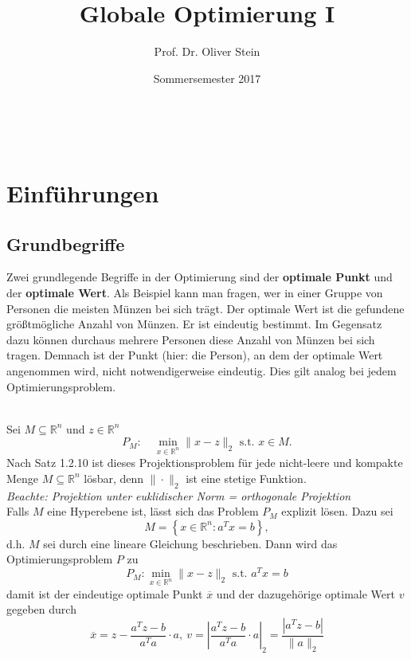 \documentclass[12pt]{extreport} %
\title{Globale Optimierung I}
\author{Prof. Dr. Oliver Stein}
\date{Sommersemester 2017}
\makeatletter
\newcommand{\R}{\mathbb{R}}
\theoremstyle{named}
\theoremstyle{nnamed}
\theoremstyle{itshape}
\theoremstyle{normal}
\def\maketitle{ \begin{titlepage} 
			~\vspace{3cm} 
		\begin{center} {\Huge \@title} \end{center} 
	 		\vspace*{1cm} 
	 	\begin{center} {\large \@author} \end{center} 
	 	\vspace*{-0.5cm}
	 	\begin{center} \@date \end{center} 
	 		\vspace*{7cm} 
	 	\begin{center} \@publishers \end{center} 
	 		\vfill 
	\end{titlepage} }
\makeatother
\begin{document}
\thispagestyle{empty}

\begin{titlepage}
	\maketitle
	\thispagestyle{empty}
\end{titlepage}



\chapter{Einführungen}

\section{Grundbegriffe}

Zwei grundlegende Begriffe in der Optimierung sind der \textbf{optimale Punkt} und der \textbf{optimale Wert}. Als Beispiel kann man fragen, wer in einer Gruppe von Personen die meisten Münzen bei sich trägt. Der optimale Wert ist die gefundene größtmögliche Anzahl von Münzen. Er ist eindeutig bestimmt. Im Gegensatz dazu können durchaus mehrere Personen diese Anzahl von Münzen bei sich tragen. Demnach ist der Punkt (hier: die Person), an dem der optimale Wert angenommen wird, nicht notwendigerweise eindeutig. Dies gilt analog bei jedem Optimierungsproblem.

\begin{beispiel} ~\\
Sei $M \subseteq \R^n$ und $z \in \R^n$
$$ P_M: \quad \min_{x \in \R^n} \| x - z \|_2 \text{ s.t. } x \in M. $$
Nach Satz 1.2.10 ist dieses Projektionsproblem für jede nicht-leere und kompakte Menge $M \subseteq \R^n$ lösbar, denn $\| \cdot \|_2$ ist eine stetige Funktion. ~\\

\textit{Beachte: Projektion unter euklidischer Norm = orthogonale Projektion} ~\\

Falls $M$ eine Hyperebene ist, lässt sich das Problem $P_M$ explizit lösen. Dazu sei 
$$ M = \left\{ x \in \R^n \colon a^T x = b \right\}, $$
d.h. $M$ sei durch eine lineare Gleichung beschrieben. Dann wird das Optimierungsproblem $P$ zu
$$ P_M\colon \min_{x \in \R^n} \| x - z \|_2 \text{ s.t. } a^Tx = b $$
damit ist der eindeutige optimale Punkt $\overline{x}$ und der dazugehörige optimale Wert $v$ gegeben durch
$$ \overline{x} = z - \frac{a^T z - b}{a^T a} \cdot a, ~ v = \left| \frac{a^T z - b}{a^T a} \cdot a \right|_2 = \frac{\left| a^T z - b \right|}{\| a \|_2}$$
\end{beispiel}
\end{document}
